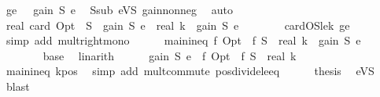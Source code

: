 \begin{isabellebody}
\ ge{}{\isacharcolon}{\kern0pt}\ {\isachardoublequoteopen}{}\ {\isasymle}\ gain\ S\ e{\isachardoublequoteclose}\ \isamarkupfalse%
\ S{\isacharunderscore}{\kern0pt}sub\ eVS\ gain{\isacharunderscore}{\kern0pt}nonneg\ \isamarkupfalse%
\ auto\isanewline
\isanewline
\ \ \ \ \isamarkupfalse%
\ {\isachardoublequoteopen}real\ {\isacharparenleft}{\kern0pt}card\ {\isacharparenleft}{\kern0pt}Opt\ {\isacharminus}{\kern0pt}\ S{\isacharparenright}{\kern0pt}{\isacharparenright}{\kern0pt}\ {\isacharasterisk}{\kern0pt}\ gain\ S\ e\ {\isasymle}\ real\ k\ {\isacharasterisk}{\kern0pt}\ gain\ S\ e{\isachardoublequoteclose}\isanewline
\ \ \ \ \ \ \isamarkupfalse%
\ cardOS{\isacharunderscore}{\kern0pt}le{\isacharunderscore}{\kern0pt}k\ ge{}\ \isamarkupfalse%
\ {\isacharparenleft}{\kern0pt}simp\ add{\isacharcolon}{\kern0pt}\ mult{\isacharunderscore}{\kern0pt}right{\isacharunderscore}{\kern0pt}mono{\isacharparenright}{\kern0pt}\isanewline
\ \ \ \ \isamarkupfalse%
\ main{\isacharunderscore}{\kern0pt}ineq{\isacharcolon}{\kern0pt}\ {\isachardoublequoteopen}f\ Opt\ {\isacharminus}{\kern0pt}\ f\ S\ {\isasymle}\ real\ k\ {\isacharasterisk}{\kern0pt}\ gain\ S\ e{\isachardoublequoteclose}\isanewline
\ \ \ \ \ \ \isamarkupfalse%
\ base\ \isamarkupfalse%
\ linarith\isanewline
\isanewline
\ \ \ \ \isamarkupfalse%
\ {\isachardoublequoteopen}gain\ S\ e\ {\isasymge}\ {\isacharparenleft}{\kern0pt}f\ Opt\ {\isacharminus}{\kern0pt}\ f\ S{\isacharparenright}{\kern0pt}\ {\isacharslash}{\kern0pt}\ real\ k{\isachardoublequoteclose}\isanewline
\ \ \ \ \ \ \isamarkupfalse%
\ main{\isacharunderscore}{\kern0pt}ineq\ k{\isacharunderscore}{\kern0pt}pos\ \isamarkupfalse%
\ {\isacharparenleft}{\kern0pt}simp\ add{\isacharcolon}{\kern0pt}\ mult{\isachardot}{\kern0pt}commute\ pos{\isacharunderscore}{\kern0pt}divide{\isacharunderscore}{\kern0pt}le{\isacharunderscore}{\kern0pt}eq{\isacharparenright}{\kern0pt}\isanewline
\ \ \ \ \isamarkupfalse%
\ {\isacharquery}{\kern0pt}thesis\ \isamarkupfalse%
\ eVS\ \isamarkupfalse%
\ blast\isanewline
\ \ \isamarkupfalse%
\isanewline
{}\isamarkupfalse%
%
\endisatagproof
{\isafoldproof}%
%
\isadelimproof
%
\endisadelimproof
%
\isadelimdocument
%
\endisadelimdocument
%
\isatagdocument
%
\end{isabellebody}

